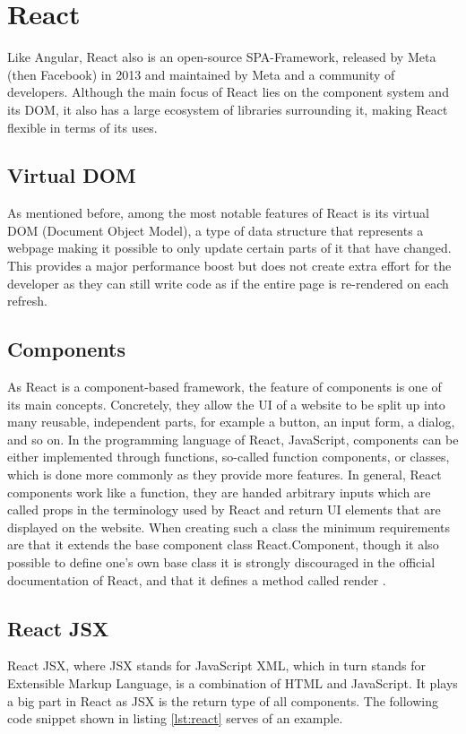 \section{React}
Like Angular, React also is an open-source SPA-Framework, released by Meta (then Facebook) in 2013 and maintained by
Meta and a community of developers. Although the main focus of React lies on the component system and its DOM, it also 
has a large ecosystem of libraries surrounding it, making React flexible in terms of its uses.

\subsection{Virtual DOM}
As mentioned before, among the most notable features of React is its virtual DOM (Document Object Model), a type of 
data structure that represents a webpage making it possible to only update certain parts of it that have changed. 
This provides a major performance boost but does not create extra effort for the developer as they can still write 
code as if the entire page is re-rendered on each refresh.

\subsection{Components}
As React is a component-based framework, the feature of components is one of its main concepts. Concretely, they
allow the UI of a website to be split up into many reusable, independent parts,
for example a button, an input form, a dialog, and so on. In the programming language of React, JavaScript,
components can be either implemented through functions, so-called function components, or classes, which is done 
more commonly as they provide more features. In general, React components work like a function, they are handed 
arbitrary inputs which are called props in the terminology used by React
and return UI elements that are displayed on the website. When creating 
such a class the minimum requirements are that it extends the base component class React.Component, though it 
also possible to define one's own base class it is strongly discouraged in the official documentation of React,
and that it defines a method called render \cite{ReactComponentProps} \cite{ReactComponent}.
\\
\subsection{React JSX}
React JSX, where JSX stands for JavaScript XML, which in turn stands for Extensible Markup Language, is a combination
of HTML and JavaScript. It plays a big part in React as JSX is the return type of all components. The following 
code snippet shown in listing \ref{lst:react} serves of an example.

